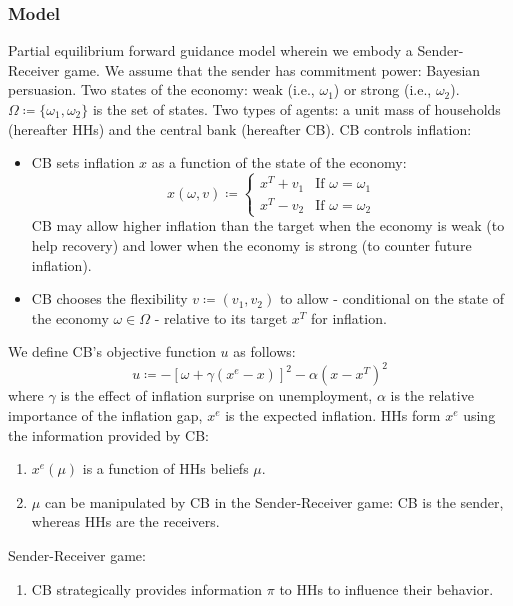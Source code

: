 \documentclass{beamer}
\begin{document}
\begin{frame}[allowframebreaks]
\frametitle{Model}
Partial equilibrium forward guidance model wherein we embody a Sender-Receiver game. 
\vskip10pt
We assume that the sender has commitment power: Bayesian persuasion. 
\vskip10pt
Two states of the economy: weak (i.e., $\omega_1$) or strong (i.e., $\omega_2$). $\Omega \coloneqq \{\omega_1, \omega_2\}$ is the set of states.
\vskip10pt
Two types of agents: a unit mass of households (hereafter HHs) and the central bank (hereafter CB). 
\vskip10pt 
\framebreak
CB controls inflation:
\vskip10pt
\begin{itemize}
    \item CB sets inflation $x$ as a function of the state of the economy: 
    \begin{equation*}
        x(\omega,v)\coloneqq\left\{
        \begin{array}{cc}
        x^T+v_1&  \mbox{If } \omega=\omega_1\\
        x^T-v_2   &  \mbox{If } \omega=\omega_2
        \end{array}
        \right.
    \end{equation*}
    CB may allow higher inflation than the target when the economy is weak (to help recovery) and lower when the economy is strong (to counter future inflation).
    \vskip10pt
    \item CB chooses the flexibility $v\coloneqq(v_1,v_2)$ to allow - conditional on the state of the economy $\omega\in \Omega$ - relative to its target $x^T$ for inflation.
\end{itemize} We define CB's objective function $u$ as follows:
\begin{equation}
    \label{uc}
    u \coloneqq -\left[\omega+\gamma(x^e-x)\right]^2-\alpha(x-x^T)^2
\end{equation}
where $\gamma$ is the effect of inflation surprise on unemployment, $\alpha$ is the relative importance of the inflation gap, $x^e$ is the expected inflation.
\vskip10pt
HHs form $x^e$ using the information provided by CB:
\begin{enumerate}
    \item $x^e(\mu)$ is a function of HHs beliefs $\mu$.
    \item $\mu$ can be manipulated by CB in the Sender-Receiver game: CB is the sender, whereas HHs are the receivers.
\end{enumerate}
\vskip10pt
\framebreak
Sender-Receiver game: 
\begin{enumerate}
    \item CB strategically provides information $\pi$ to HHs to influence their behavior.

\end{enumerate}
\end{frame}
\end{document}
